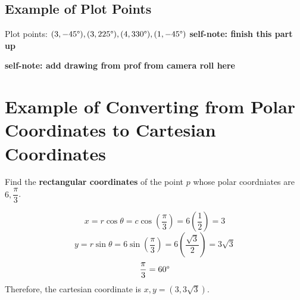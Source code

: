 \documentclass{article}
\begin{document}
\subsection*{Example of Plot Points}
\begin{examplebox}
Plot points: \( (3, -45\text{\textdegree}), (3, 225\text{\textdegree}), (4, 330\text{\textdegree}), (1, -45\text{\textdegree}) \)
\textbf{self-note: finish this part up}


\textbf{self-note: add drawing from prof from camera roll here}
\end{examplebox}

\section*{Example of Converting from Polar Coordinates to Cartesian Coordinates}
\begin{examplebox}
Find the \textbf{rectangular coordinates} of the point \( p \) whose polar coordniates are \( 6, \dfrac{\pi}{3}\).

\begin{solutionbox}
\[
    x = r\cos\theta = c\cos(\dfrac{\pi}{3}) = 6(\frac{1}{2}) = 3
\]
\[
    y = r\sin\theta=6\sin(\dfrac{\pi}{3}) = 6(\frac{\sqrt{3}}{2}) = 3\sqrt{3} 
\]
\[
    \frac{\pi}{3} = 60\text{\textdegree}
\]
Therefore, the cartesian coordinate is \( x, y = (3, 3\sqrt{3}) \).
\end{solutionbox}
\end{examplebox}
\end{document}
